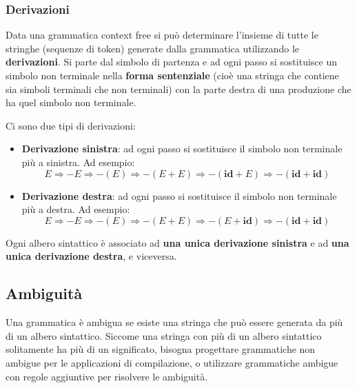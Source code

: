 \documentclass[a4paper]{article}
\begin{document}
\subsubsection{Derivazioni}
Data una grammatica context free si può determinare l'insieme di tutte le stringhe
(sequenze di token) generate dalla grammatica utilizzando le \textbf{derivazioni}.
Si parte dal simbolo di partenza e ad ogni passo si sostituisce un simbolo non terminale
nella \textbf{forma sentenziale} (cioè una stringa che contiene sia simboli terminali
che non terminali) con la parte destra di una produzione che ha quel simbolo non terminale.

\vspace{1em}
\noindent
Ci sono due tipi di derivazioni:
\begin{itemize}
  \item \textbf{Derivazione sinistra}: ad ogni passo si sostituisce il simbolo non
    terminale più a sinistra. Ad esempio:
    \[
      E \Rightarrow -E \Rightarrow -(E) \Rightarrow -(E + E) \Rightarrow
      -(\textbf{id} + E) \Rightarrow -(\textbf{id} + \textbf{id})
    \] 

  \item \textbf{Derivazione destra}: ad ogni passo si sostituisce il simbolo non
    terminale più a destra. Ad esempio:
    \[
      E \Rightarrow -E \Rightarrow -(E) \Rightarrow -(E + E) \Rightarrow
      -(E + \textbf{id}) \Rightarrow -(\textbf{id} + \textbf{id})
    \] 
\end{itemize}

\begin{theorem}
  Ogni albero sintattico è associato ad \textbf{una unica derivazione sinistra} e ad
  \textbf{una unica derivazione destra}, e viceversa.
\end{theorem}

\subsection{Ambiguità}
Una grammatica è ambigua se esiste una stringa che può essere generata da più di
un albero sintattico.
Siccome una stringa con più di un albero sintattico solitamente ha più di un significato,
bisogna progettare grammatiche non ambigue per le applicazioni di compilazione, o
utilizzare grammatiche ambigue con regole aggiuntive per risolvere le ambiguità.
\end{document}
